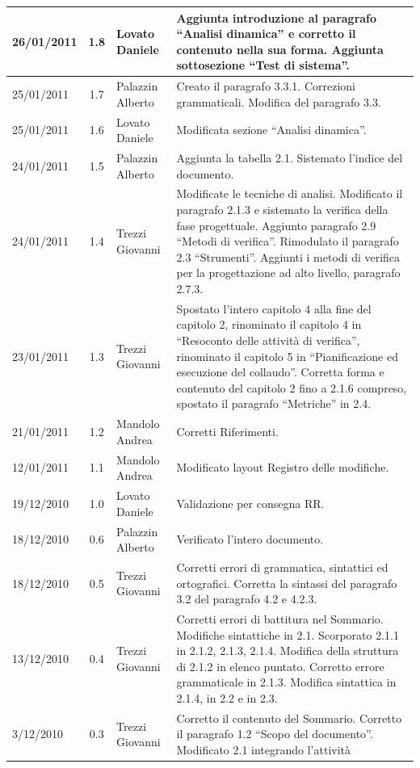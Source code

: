 \begin{longtable}{|p{}|c|p{}|p{}|}
\hline
26/01/2011 & 1.8 & Lovato Daniele & Aggiunta introduzione al paragrafo
``Analisi dinamica'' e corretto il contenuto nella sua forma. Aggiunta
sottosezione ``Test di sistema''.\\
\hline
25/01/2011 & 1.7 & Palazzin Alberto & Creato il paragrafo 3.3.1. Correzioni
grammaticali. Modifica del paragrafo 3.3.\\
\hline
25/01/2011 & 1.6 & Lovato Daniele & Modificata sezione ``Analisi dinamica''.\\
\hline
24/01/2011 & 1.5 & Palazzin Alberto & Aggiunta la tabella 2.1. Sistemato
l'indice del documento.\\
\hline
24/01/2011 & 1.4 & Trezzi Giovanni & Modificate le tecniche di analisi.
Modificato il paragrafo 2.1.3 e sistemato la verifica della fase progettuale.
Aggiunto paragrafo 2.9 ``Metodi di verifica''. Rimodulato il paragrafo 2.3
``Strumenti''. Aggiunti i metodi di verifica per la progettazione ad alto
livello, paragrafo 2.7.3.\\
\hline
23/01/2011 & 1.3 & Trezzi Giovanni & Spostato l'intero capitolo 4 alla fine
del capitolo 2, rinominato il capitolo 4 in ``Resoconto delle attivit\`a di
verifica'', rinominato il capitolo 5 in ``Pianificazione ed esecuzione del
collaudo''. Corretta forma e contenuto del capitolo 2 fino a 2.1.6 compreso,
spostato il paragrafo ``Metriche'' in 2.4.  
\\
\hline
21/01/2011 & 1.2 & Mandolo Andrea & Corretti Riferimenti.\\
\hline
12/01/2011 & 1.1 & Mandolo Andrea & Modificato layout Registro delle
modifiche.\\
\hline
19/12/2010 & 1.0 & Lovato Daniele & Validazione per consegna RR.\\
\hline
18/12/2010 & 0.6 & Palazzin Alberto & Verificato l'intero documento.\\
\hline
18/12/2010 & 0.5 & Trezzi Giovanni & Corretti errori di grammatica, sintattici
ed ortografici. Corretta la sintassi del paragrafo 3.2 del paragrafo 4.2 e
4.2.3.\\
\hline
13/12/2010 & 0.4 & Trezzi Giovanni & Corretti errori di battitura nel Sommario.
Modifiche sintattiche in 2.1. Scorporato 2.1.1 in 2.1.2, 2.1.3, 2.1.4. Modifica della
struttura di 2.1.2 in elenco puntato. Corretto errore grammaticale in 2.1.3.
Modifica sintattica in 2.1.4, in 2.2 e in 2.3.\\
\hline
3/12/2010 & 0.3 & Trezzi Giovanni & Corretto il contenuto del Sommario. Corretto
il paragrafo 1.2 ``Scopo del documento''. Modificato 2.1 integrando l'attivit\`a

\end{longtable}
